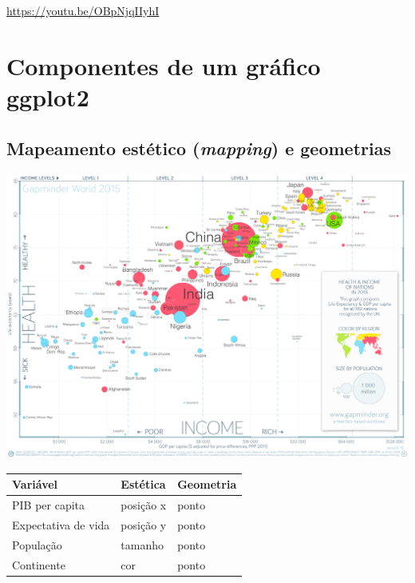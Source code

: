 \documentclass[
  11pt]{report}
\begin{document}
\begin{center} \url{https://youtu.be/OBpNjqIIyhI} \end{center}

\hypertarget{componentes-de-um-gruxe1fico-ggplot2}{%
\section{Componentes de um gráfico ggplot2}\label{componentes-de-um-gruxe1fico-ggplot2}}

\hypertarget{mapeamento-estuxe9tico-mapping-e-geometrias}{%
\subsection{\texorpdfstring{Mapeamento estético (\emph{mapping}) e geometrias}{Mapeamento estético (mapping) e geometrias}}\label{mapeamento-estuxe9tico-mapping-e-geometrias}}

\begin{center}\includegraphics[width=1\linewidth]{images/countries-1} \end{center}

\begin{longtable}[]{@{}lll@{}}
\toprule
Variável & Estética & Geometria \\
\midrule
\endhead
PIB per capita & posição x & ponto \\
Expectativa de vida & posição y & ponto \\
População & tamanho & ponto \\
Continente & cor & ponto \\
\bottomrule
\end{longtable}
\end{document}
